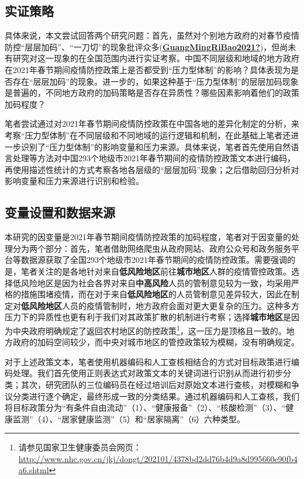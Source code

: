 \documentclass[
  12pt,
]{ctexart}
\begin{document}
\hypertarget{ux5b9eux8bc1ux7b56ux7565}{%
\subsection{实证策略}\label{ux5b9eux8bc1ux7b56ux7565}}

具体来说，本文尝试回答两个研究问题：首先，虽然对个别地方政府的对春节疫情防控``层层加码''、``一刀切''的现象批评众多(\protect\hyperlink{ref-GuangMingRiBao2021}{\textbf{GuangMingRiBao2021?}})，但尚未有研究对这一现象的在全国范围内进行实证考察。中国不同层级和地域的地方政府在2021年春节期间疫情防控政策上是否都受到``压力型体制''的影响？具体表现为是否存在``层层加码''的现象。进一步的，如果这种基于``压力型体制''的层层加码现象是普遍的，不同地方政府的加码策略是否存在异质性？哪些因素影响着他们的政策加码程度？

笔者尝试通过对2021年春节期间疫情防控政策在中国各地的差异化制定的分析，来考察``压力型体制''在不同层级和不同地域的运行逻辑和机制，在此基础上笔者还进一步识别了``压力型体制''的影响变量和压力来源。具体来说，笔者首先使用自然语言处理等方法对中国293个地级市2021年春节期间的疫情防控政策文本进行编码，再使用描述性统计的方式考察各地各层级的``层层加码''现象；之后借助回归分析对影响变量和压力来源进行识别和检验。

\hypertarget{ux53d8ux91cfux8bbeux7f6eux548cux6570ux636eux6765ux6e90}{%
\subsection{变量设置和数据来源}\label{ux53d8ux91cfux8bbeux7f6eux548cux6570ux636eux6765ux6e90}}

本研究的因变量是2021年春节期间疫情防控政策的加码程度，笔者对于因变量的处理分为两个部分：首先，笔者借助网络爬虫从政府网站、政府公众号和政务服务平台等数据源获取了全国293个地级市2021年春节期间的疫情防控政策。需要强调的是，笔者关注的是各地针对来自\textbf{低风险地区}前往\textbf{城市地区}人群的疫情管控政策。选择低风险地区是因为社会各界对来自\textbf{中高风险}人员的管制意见较为一致，均采用严格的措施围堵疫情，而在对于来自\textbf{低风险地区}的人员管制意见差异较大，因此在制定对\textbf{低风险地区}人员的疫情管制时，地方政府会面对更大更复杂的压力。这种多方压力下的异质性也更有利于我们对其政策扩散的机制进行考察；选择\textbf{城市地区}是因为中央政府明确规定了返回农村地区的防控政策\footnote{请参见国家卫生健康委员会网页：\url{http://www.nhc.gov.cn/jkj/dongt/202101/4378bd2dd76b4d9a8d995660e90fb4a6.shtml}}，这一压力是顶格且一致的。地方政府的加码空间较少，而中央对城市地区的管控政策较为模糊，没有明确规定。

对于上述政策文本，笔者使用机器编码和人工查核相结合的方式对目标政策进行编码处理。我们首先使用正则表达式对政策文本的关键词进行识别从而进行初步分类；其次，研究团队的三位编码员在经过培训后对原始文本进行查核，对模糊和争议分类进行逐个确定，最终形成一致的分类结果。通过机器编码和人工查核，我们将目标政策分为``有条件自由流动''（1）、``健康报备''（2）、``核酸检测''（3）、``健康监测''（4）、``居家健康监测''（5）和``居家隔离''（6）六种类型。
\end{document}
